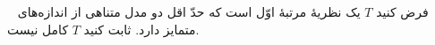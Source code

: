 ~
فرض کنید $T$ یک نظریهٔ مرتبهٔ اوّل است که حدّ اقل دو مدل متناهی از اندازه‌های متمایز دارد. ثابت کنید $T$ کامل نیست.